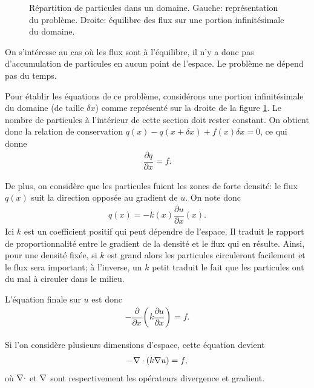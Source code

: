 \documentclass[12pt,a4paper,twoside]{article}
\begin{document}
\begin{figure}
\begin{tikzpicture}[scale = 3]
  
\end{tikzpicture}
\begin{tikzpicture}[scale = 2.5]
  
\end{tikzpicture}
\caption{R\'epartition de particules dans un domaine. Gauche: repr\'esentation du probl\`eme.
  Droite: \'equilibre des flux sur une portion infinit\'esimale du domaine.}
\label{fig:flux}
\end{figure}


On s'int\'eresse au cas o\`u les flux sont \`a l'\'equilibre, il n'y
a donc pas d'accumulation de particules en aucun point de l'espace.
Le probl\`eme ne d\'epend pas du temps.


Pour \'etablir les \'equations de ce probl\`eme,
consid\'erons une portion infinit\'esimale du domaine (de taille $\delta x$) comme
repr\'esent\'e sur la droite de la figure \ref{fig:flux}.
Le nombre de particules \`a l'int\'erieur de cette section doit
rester constant.
On obtient donc la relation de conservation
$q(x) - q(x+\delta x) + f(x) \delta x = 0$,
ce qui donne
\begin{align}
  \label{eq:eq_flux}
  \dfrac{\partial q}{\partial x} = f .
\end{align}

De plus, on consid\`ere que les particules fuient les zones de forte densit\'e:
le flux $q(x)$ suit la direction oppos\'ee au gradient de $u$.
On note donc 
\begin{align}
  \label{eq:def_flux}
  q(x) = - k(x) \dfrac{\partial u}{\partial x}(x) . 
\end{align}
Ici $k$ est un coefficient positif qui peut d\'ependre de l'espace.
Il traduit le rapport de proportionnalit\'e entre le gradient de la densit\'e
et le flux qui en r\'esulte. Ainsi, pour une densit\'e fix\'ee,
si $k$ est grand alors les particules circuleront facilement et le flux sera important;
\`a l'inverse, un $k$ petit traduit le fait que les particules ont du mal \`a circuler dans
le milieu.

L'\'equation finale sur $u$ est donc
\begin{align}
  \label{eq:ell_1D}
  - \dfrac{\partial}{\partial x} \left(k \dfrac{\partial u}{\partial x} \right) = f .
\end{align}

Si l'on consid\`ere plusieurs dimensions d'espace, cette \'equation devient
\begin{align}
  \label{eq:ell_2D}
  - \DIV \left(k \GRAD u \right) = f ,
\end{align}
o\`u $\DIV$ et $\GRAD$ sont respectivement les op\'erateurs divergence et gradient.
\end{document}
